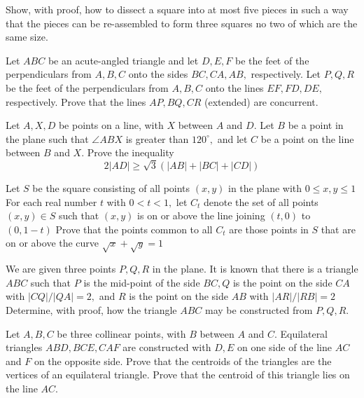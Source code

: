 \documentclass{pset}
\begin{document}
\begin{problems}
\begin{problem}[IrMO 1996 Q5]
    Show, with proof, how to dissect a square into at most five pieces in such a way that the pieces can be re-assembled to form three squares no two of which are the same size.
\end{problem}

\begin{problem}[IrMO 1996 Q10]
    Let \(A B C\) be an acute-angled triangle and let \(D, E, F\) be the feet of the perpendiculars from \(A, B, C\) onto the sides \(B C, C A, A B,\) respectively. Let \(P, Q, R\) be the feet of the perpendiculars from \(A, B, C\) onto the lines \(E F, F D, D E,\) respectively. Prove that the lines \(A P, B Q, C R\) (extended) are concurrent.
\end{problem}

\begin{problem}[IrMO 1995 Q3]
    Let \(A, X, D\) be points on a line, with \(X\) between \(A\) and \(D .\) Let \(B\) be a point in the plane such that \(\angle A B X\) is greater than \(120^{\circ},\) and let \(C\) be a point on the line between \(B\) and \(X .\) Prove the inequality
    $$
    2|A D| \geq \sqrt{3}(|A B|+|B C|+|C D|)
    $$
\end{problem}

\begin{problem}[IrMO 1995 Q8]
    Let \(S\) be the square consisting of all points \((x, y)\) in the plane with \(0 \leq x, y \leq 1\) For each real number \(t\) with \(0<t<1,\) let \(C_{t}\) denote the set of all points \((x, y) \in S\) such that \((x, y)\) is on or above the line joining \((t, 0)\) to \((0,1-t)\) Prove that the points common to all \(C_{t}\) are those points in \(S\) that are on or above the curve \(\sqrt{x}+\sqrt{y}=1\)
\end{problem}

\begin{problem}[IrMO 1995 Q9]
    We are given three points \(P, Q, R\) in the plane. It is known that there is a triangle
    \(A B C\) such that \(P\) is the mid-point of the side \(B C, Q\) is the point on the side \(C A\) with \(|C Q| /|Q A|=2,\) and \(R\) is the point on the side \(A B\) with \(|A R| /|R B|=2\) Determine, with proof, how the triangle \(A B C\) may be constructed from \(P, Q, R .\)
\end{problem}


\begin{problem}[IrMO 1994 Q2]
    Let \(A, B, C\) be three collinear points, with \(B\) between \(A\) and \(C .\) Equilateral triangles
    \(A B D, B C E, C A F\) are constructed with \(D, E\) on one side of the line \(A C\) and \(F\) on the opposite side. Prove that the centroids of the triangles are the vertices of an equilateral triangle. Prove that the centroid of this triangle lies on the line \(A C .\)
\end{problem}


\end{problems}
\end{document}
